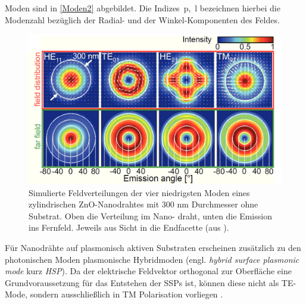 Moden sind in \autoref{Moden2} abgebildet. Die \mbox{Indizes p, l} bezeichnen
hierbei die Modenzahl bezüglich der Radial- und der Winkel-Komponenten des
Feldes.\begin{figure}[h] \centering
\includegraphics[width=.5\textwidth]{Bilder/Vorbetrachtung/moden2}
\caption[Feldverteilung der Moden eines ZnO-Nanodrahtes]{Simulierte
Feldverteilungen der vier niedrigsten Moden eines zylindrischen ZnO-Nanodrahtes
mit 300 nm Durchmesser ohne Substrat. Oben die Verteilung im Nano- draht, unten
die Emission ins Fernfeld. Jeweils aus Sicht in die Endfacette (aus
\cite{Roeder.Diss}).} \label{Moden2} \end{figure}Für Nanodrähte auf plasmonisch
aktiven Substraten erscheinen zusätzlich zu den photonischen Moden plasmonische
Hybridmoden (engl. \textit{hybrid surface plasmonic mode} kurz \textit{HSP}). Da
der elektrische Feldvektor orthogonal zur Oberfläche eine Grundvoraussetzung für
das Entstehen der SSPs ist, können diese nicht als TE-Mode, sondern
ausschließlich in TM Polarisation vorliegen \cite{Maier.2010}.

